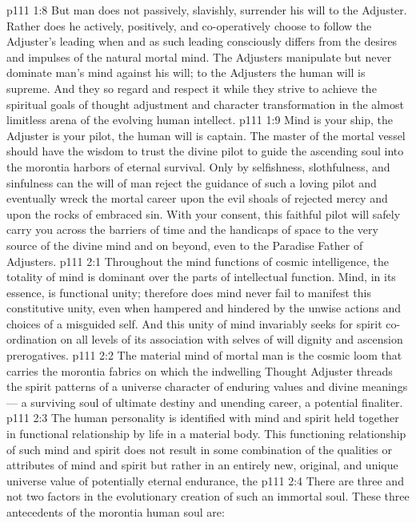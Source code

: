 \vs p111 1:8 But man does not passively, slavishly, surrender his will to the Adjuster. Rather does he actively, positively, and co\hyp{}operatively choose to follow the Adjuster’s leading when and as such leading consciously differs from the desires and impulses of the natural mortal mind. The Adjusters manipulate but never dominate man’s mind against his will; to the Adjusters the human will is supreme. And they so regard and respect it while they strive to achieve the spiritual goals of thought adjustment and character transformation in the almost limitless arena of the evolving human intellect.
\vs p111 1:9 \pc Mind is your ship, the Adjuster is your pilot, the human will is captain. The master of the mortal vessel should have the wisdom to trust the divine pilot to guide the ascending soul into the morontia harbors of eternal survival. Only by selfishness, slothfulness, and sinfulness can the will of man reject the guidance of such a loving pilot and eventually wreck the mortal career upon the evil shoals of rejected mercy and upon the rocks of embraced sin. With your consent, this faithful pilot will safely carry you across the barriers of time and the handicaps of space to the very source of the divine mind and on beyond, even to the Paradise Father of Adjusters.
\vs p111 2:1 Throughout the mind functions of cosmic intelligence, the totality of mind is dominant over the parts of intellectual function. Mind, in its essence, is functional unity; therefore does mind never fail to manifest this constitutive unity, even when hampered and hindered by the unwise actions and choices of a misguided self. And this unity of mind invariably seeks for spirit co\hyp{}ordination on all levels of its association with selves of will dignity and ascension prerogatives.
\vs p111 2:2 The material mind of mortal man is the cosmic loom that carries the morontia fabrics on which the indwelling Thought Adjuster threads the spirit patterns of a universe character of enduring values and divine meanings --- a surviving soul of ultimate destiny and unending career, a potential finaliter.
\vs p111 2:3 The human personality is identified with mind and spirit held together in functional relationship by life in a material body. This functioning relationship of such mind and spirit does not result in some combination of the qualities or attributes of mind and spirit but rather in an entirely new, original, and unique universe value of potentially eternal endurance, the 
\vs p111 2:4 \pc There are three and not two factors in the evolutionary creation of such an immortal soul. These three antecedents of the morontia human soul are:

